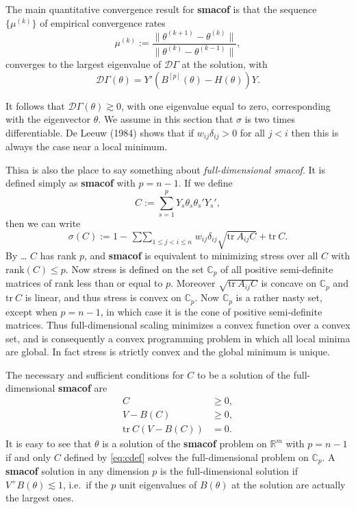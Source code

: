 \documentclass[
  12pt,
]{article}
\newcommand{\jis}{\mathop{\sum\sum}_{1\leq j<i\leq n}}
\begin{document}
The main quantitative convergence result for \textbf{smacof} is that the sequence \(\{\mu^{(k)}\}\) of empirical convergence rates
\begin{equation}
\mu^{(k)}:=\frac{\|\theta^{(k+1)}-\theta^{(k)}\|}{\|\theta^{(k)}-\theta^{(k-1)}\|},
\label{eq:defmu}
\end{equation}
converges to the largest eigenvalue of \(\mathcal{D}\Gamma\) at the solution, with
\begin{equation}
\mathcal{D}\Gamma(\theta)=Y'(B^{[p]}(\theta)-H(\theta))Y.
\label{eq:dergam}
\end{equation}

It follows that \(\mathcal{D}\Gamma(\theta)\gtrsim 0\), with one eigenvalue
equal to zero, corresponding with the eigenvector \(\theta\). We assume in this
section that \(\sigma\) is two times differentiable. De Leeuw (1984) shows that
if \(w_{ij}\delta_{ij}>0\) for all \(j<i\) then this is always the case near a
local minimum.

Thisa is also the place to say something about \emph{full-dimensional smacof}. It is defined
simply as \textbf{smacof} with \(p=n-1\). If we define
\begin{equation}
C:=\sum_{s=1}^pY_s\theta_s\theta_s'Y_s',
\label{eq:cdef}
\end{equation}
then we can write
\[
\sigma(C):=1-\jis w_{ij}\delta_{ij}\sqrt{\text{tr}\ A_{ij}C}+\text{tr}\ C.
\]
By \ldots{} \(C\) has rank \(p\), and \textbf{smacof} is equivalent to minimizing stress over all
\(C\) with \(\text{rank}(C)\leq p\). Now stress is defined on the set \(\mathbb{C}_p\) of all
positive semi-definite matrices of rank less than or equal to \(p\). Moreover
\(\sqrt{\text{tr}\ A_{ij}C}\) is concave on \(\mathbb{C}_p\) and \(\text{tr}\ C\) is
linear, and thus stress is convex on \(\mathbb{C}_p\). Now \(\mathbb{C}_p\) is
a rather nasty set, except when \(p=n-1\), in which case it is the cone of
positive semi-definite matrices. Thus full-dimensional scaling minimizes a
convex function over a convex set, and is consequently a convex programming
problem in which all local minima are global. In fact stress is strictly
convex and the global minimum is unique.

The necessary and sufficient conditions for \(C\) to be a solution of the
full-dimensional \textbf{smacof} are
\begin{align}
C&\geq 0,\label{eq:fds1}\\
V-B(C)&\geq 0,\label{eq:fds2}\\
\text{tr}\ C(V-B(C))&=0.\label{eq:fds3}
\end{align}
It is easy to see that \(\theta\) is a solution of the \textbf{smacof} problem on \(\mathbb{R}^m\)
with \(p=n-1\) if and only \(C\) defined by \eqref{eq:cdef} solves the full-dimensional
problem on \(\mathbb{C}_p\). A \textbf{smacof} solution in any dimension \(p\) is the full-dimensional
solution if \(V^+B(\theta)\lesssim 1\), i.e.~if the \(p\) unit eigenvalues of \(B(\theta)\)
at the solution are actually the largest ones.
\end{document}
